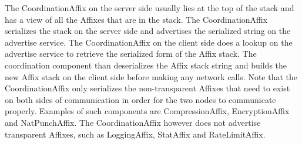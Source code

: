 The CoordinationAffix on the server side usually lies at the top of the stack and has a view
of all the Affixes that are in the stack. The CoordinationAffix serializes the stack on the
server side and advertises the serialized string on the advertise service. The CoordinationAffix
on the client side does a lookup on the advertise service to retrieve the serialized form of the
Affix stack. The coordination component than deserializes the Affix stack string and builds
the new Affix stack on the client side before making any network calls. Note that the 
CoordinationAffix only serializes the non-transparent Affixes that need to exist on both
sides of communication in order for the two nodes to communicate properly. Examples of such
components are CompressionAffix, EncryptionAffix and NatPunchAffix. The CoordinationAffix
however does not advertise transparent Affixes, such as LoggingAffix, StatAffix and RateLimitAffix.
\fi
